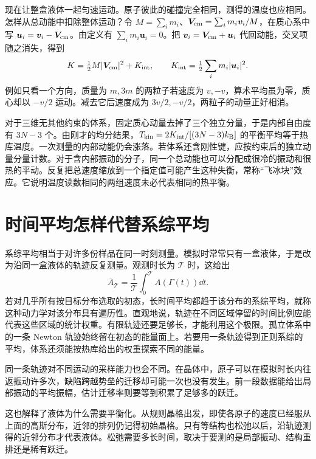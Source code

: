 现在让整盒液体一起匀速运动。原子彼此的碰撞完全相同，测得的温度也应相同。怎样从总动能中扣除整体运动？令 $M=\sum_i m_i$、$\bm V_{\rm cm}=\sum_i m_i\bm v_i/M$，在质心系中写 $\bm u_i=\bm v_i-\bm V_{\rm cm}$。由定义有 $\sum_i m_i\bm u_i=0$。把 $\bm v_i=\bm V_{\rm cm}+\bm u_i$ 代回动能，交叉项随之消失，得到
\begin{equation}\label{md:internal-kinetic}
 K=\tfrac12 M|\bm V_{\rm cm}|^2+K_{\rm int},\qquad
 K_{\rm int}=\tfrac12\sum_i m_i|\bm u_i|^2 .
\end{equation}
例如只看一个方向，质量为 $m,3m$ 的两粒子若速度为 $v,-v$，算术平均虽为零，质心却以 $-v/2$ 运动。减去它后速度成为 $3v/2,-v/2$，两粒子的动量正好相消。

对于三维无其他约束的体系，固定质心动量去掉了三个独立分量，于是内部自由度有 $3N-3$ 个。由刚才的均分结果，$T_{\rm kin}=2K_{\rm int}/[(3N-3)k_{\mathrm B}]$ 的平衡平均等于热库温度。一次测量的内部动能仍会涨落。若体系还含刚性键，应按约束后的独立动量分量计数。对于含内部振动的分子，同一个总动能也可以分配成很冷的振动和很热的平动。反复把总速度缩放到一个指定值可能产生这种失衡，常称“飞冰块”效应。它说明温度读数相同的两组速度未必代表相同的热平衡。

\section{时间平均怎样代替系综平均}
系综平均相当于对许多份样品在同一时刻测量。模拟时常常只有一盒液体，于是改为沿同一盒液体的轨迹反复测量。观测时长为 $\mathcal T$ 时，这给出
\begin{equation}
\overline A_{\mathcal T}=\frac1{\mathcal T}\int_0^{\mathcal T}A(\Gamma(t))\dd t.
\end{equation}
若对几乎所有按目标分布选取的初态，长时间平均都趋于该分布的系综平均，就称这种动力学对该分布具有遍历性。直观地说，轨迹在不同区域停留的时间比例应能代表这些区域的统计权重。有限轨迹还要足够长，才能利用这个极限。孤立体系中的一条 Newton 轨迹始终留在初态的能量面上。若要用一条轨迹得到正则系综的平均，体系还须能按热库给出的权重探索不同的能量。

同一条轨迹对不同运动的采样能力也会不同。在晶体中，原子可以在模拟时长内往返振动许多次，缺陷跨越势垒的迁移却可能一次也没有发生。前一段数据能给出局部振动的平均振幅，估计迁移率则要等到积累了足够多的跃迁。

这也解释了液体为什么需要平衡化。从规则晶格出发，即使各原子的速度已经服从上面的高斯分布，近邻的排列仍记得初始晶格。只有等结构也松弛以后，沿轨迹测得的近邻分布才代表液体。松弛需要多长时间，取决于要测的是局部振动、结构重排还是稀有跃迁。

